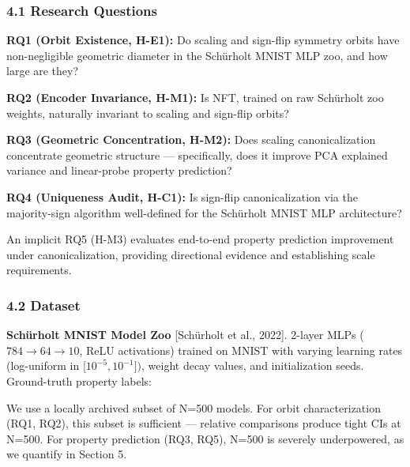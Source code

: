 
\subsubsection{4.1 Research Questions}

\textbf{RQ1 (Orbit Existence, H-E1):} Do scaling and sign-flip symmetry orbits have non-negligible geometric diameter in the Schürholt MNIST MLP zoo, and how large are they?

\textbf{RQ2 (Encoder Invariance, H-M1):} Is NFT, trained on raw Schürholt zoo weights, naturally invariant to scaling and sign-flip orbits?

\textbf{RQ3 (Geometric Concentration, H-M2):} Does scaling canonicalization concentrate geometric structure --- specifically, does it improve PCA explained variance and linear-probe property prediction?

\textbf{RQ4 (Uniqueness Audit, H-C1):} Is sign-flip canonicalization via the majority-sign algorithm well-defined for the Schürholt MNIST MLP architecture?

An implicit RQ5 (H-M3) evaluates end-to-end property prediction improvement under canonicalization, providing directional evidence and establishing scale requirements.

\subsubsection{4.2 Dataset}

\textbf{Schürholt MNIST Model Zoo} [Schürholt et al., 2022]. 2-layer MLPs ($784\rightarrow 64\rightarrow 10$, ReLU activations) trained on MNIST with varying learning rates (log-uniform in [$10^{-5}, 10^{-1}])$, weight decay values, and initialization seeds. Ground-truth property labels:

\begin{table}[htbp]
\centering
{}
\end{table}

We use a locally archived subset of N=500 models. For orbit characterization (RQ1, RQ2), this subset is sufficient --- relative comparisons produce tight CIs at N=500. For property prediction (RQ3, RQ5), N=500 is severely underpowered, as we quantify in Section 5.

